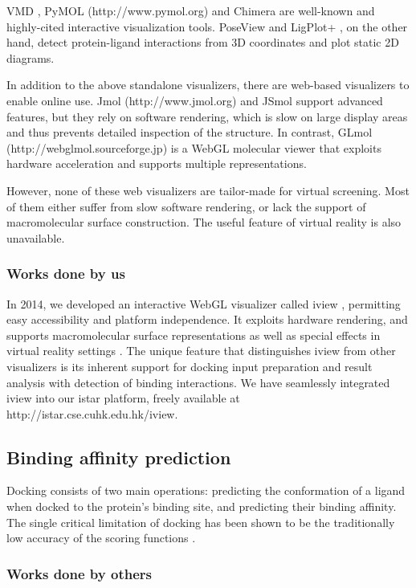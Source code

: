 \documentclass[a4paper,12pt]{article}
\begin{document}
VMD \citep{1220}, PyMOL (http://www.pymol.org) and Chimera \citep{1219} are well-known and highly-cited interactive visualization tools. PoseView \citep{748} and LigPlot+ \citep{951}, on the other hand, detect protein-ligand interactions from 3D coordinates and plot static 2D diagrams.

In addition to the above standalone visualizers, there are web-based visualizers to enable online use. Jmol (http://www.jmol.org) and JSmol \citep{1314} support advanced features, but they rely on software rendering, which is slow on large display areas and thus prevents detailed inspection of the structure. In contrast, GLmol (http://webglmol.sourceforge.jp) is a WebGL molecular viewer that exploits hardware acceleration and supports multiple representations.

However, none of these web visualizers are tailor-made for virtual screening. Most of them either suffer from slow software rendering, or lack the support of macromolecular surface construction. The useful feature of virtual reality is also unavailable.

\subsubsection*{Works done by us}

In 2014, we developed an interactive WebGL visualizer called iview \citep{1366,1265}, permitting easy accessibility and platform independence. It exploits hardware rendering, and supports macromolecular surface representations as well as special effects in virtual reality settings \citep{1265}. The unique feature that distinguishes iview from other visualizers is its inherent support for docking input preparation and result analysis with detection of binding interactions. We have seamlessly integrated iview into our istar platform, freely available at http://istar.cse.cuhk.edu.hk/iview.

\subsection*{Binding affinity prediction}

Docking consists of two main operations: predicting the conformation of a ligand when docked to the protein's binding site, and predicting their binding affinity. The single critical limitation of docking has been shown to be the traditionally low accuracy of the scoring functions \citep{1362}.

\subsubsection*{Works done by others}
\end{document}
